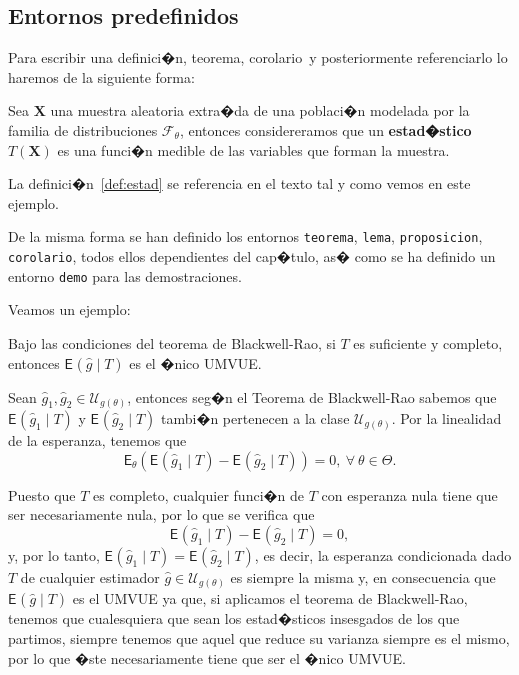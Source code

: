 \documentclass[a4paper,12pt,%
]{memoir}
\begin{document}
\subsection{Entornos predefinidos}
Para escribir una definici�n, teorema, corolario\textellipsis\ y posteriormente
referenciarlo lo haremos de la siguiente forma:
\begin{definicion} \label{def:estad}
  Sea $\boldsymbol{X}$ una muestra aleatoria extra�da de una poblaci�n
  modelada por la familia de distribuciones $\mathcal{F}_{\theta}$,
  entonces considereramos que un \textbf{estad�stico}
  $T(\boldsymbol{X})$ es una funci�n medible de las variables que
  forman la muestra.
\end{definicion}
\par
La definici�n~\ref{def:estad} se referencia en el texto tal y como
vemos en este ejemplo.
\par
De la misma forma se han definido los entornos \texttt{teorema},
\texttt{lema}, \texttt{proposicion}, \texttt{corolario}, todos ellos
dependientes del cap�tulo, as� como se ha definido un entorno
\texttt{demo} para las demostraciones.
\par 
Veamos un ejemplo:
\par
\newcommand{\E}[2]{\mathsf{E}_{#1} \!\left ( #2 \right )}
\begin{teorema}
  \label{teo:ls}
  Bajo las condiciones del teorema de Blackwell-Rao, si $T$ es
  suficiente y completo, entonces $\E{}{\hat{g} \mid T}$ es el �nico
  UMVUE.
\end{teorema}
\begin{demo}
  Sean $\hat{g}_1, \hat{g}_2 \in \mathcal{U}_{g(\theta)}$, entonces
  seg�n el Teorema de Blackwell-Rao sabemos que $\E{}{\hat{g}_1 \mid
    T}$ y $\E{}{\hat{g}_2 \mid T}$ tambi�n pertenecen a la clase
  $\mathcal{U}_{g(\theta)}$. Por la linealidad de la esperanza,
  tenemos que
  \begin{equation*}
    \E{\theta}{\E{}{\hat{g}_1 \mid T} - \E{}{\hat{g}_2 \mid T}} = 0,~
    \forall ~\theta \in \Theta. 
  \end{equation*}
  \par
  Puesto que $T$ es completo, cualquier funci�n de $T$ con esperanza
  nula tiene que ser necesariamente nula, por lo que se verifica que
  \[
  \E{}{\hat{g}_1 \mid T} - \E{}{\hat{g}_2 \mid T }=0,
  \]
  y, por lo tanto, $\E{}{\hat{g}_1 \mid T} = \E{}{\hat{g}_2 \mid T}$,
  es decir, la esperanza condicionada dado $T$ de cualquier estimador
  $\hat{g} \in \mathcal{U}_{g(\theta)}$ es siempre la misma y, en
  consecuencia que $\E{}{\hat{g} \mid T}$ es el UMVUE ya que, si
  aplicamos el teorema de Blackwell-Rao, tenemos que cualesquiera que
  sean los estad�sticos insesgados de los que partimos, siempre
  tenemos que aquel que reduce su varianza siempre es el mismo, por lo
  que �ste necesariamente tiene que ser el �nico UMVUE.
\end{demo}
\end{document}
